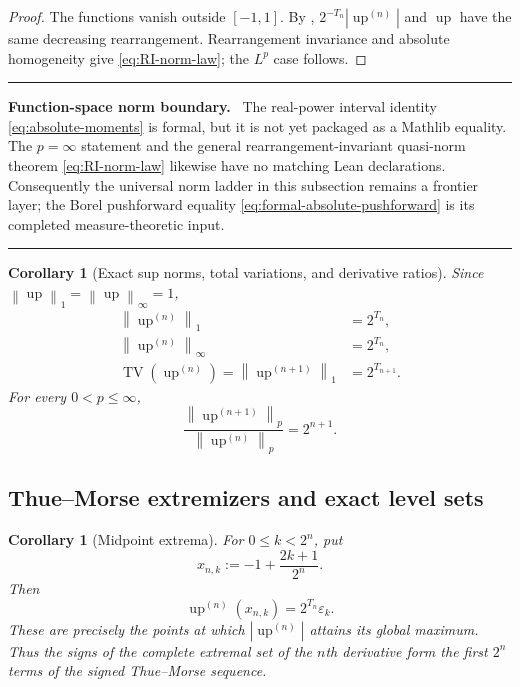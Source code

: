 \documentclass[11pt,oneside]{article}
\numberwithin{equation}{section}
\theoremstyle{plain}
\newtheorem{corollary}[theorem]{Corollary}
\theoremstyle{definition}
\theoremstyle{remark}
\newcommand{\Up}{\operatorname{up}}
\newcommand{\norm}[1]{\left\lVert#1\right\rVert}
\newenvironment{statusbox}[1]{%
  \par\medskip\noindent\begin{minipage}{\textwidth}%
  \color{DeepBlue}\hrule\vspace{5pt}%
  \color{black}\textbf{\color{DeepBlue}#1.}\ }{%
  \par\vspace{5pt}\color{DeepBlue}\hrule
  \end{minipage}\par\medskip}
\begin{document}
\begin{proof}
The functions vanish outside $[-1,1]$.  By ,
$2^{-T_n}|\Up^{(n)}|$ and $\Up$ have the same decreasing rearrangement.  Rearrangement
invariance and absolute homogeneity give \eqref{eq:RI-norm-law}; the $L^p$ case follows.
\end{proof}

\begin{statusbox}{Function-space norm boundary}
The real-power interval identity \eqref{eq:absolute-moments} is formal, but it is not yet
packaged as a Mathlib  equality.  The \(p=\infty\) statement and the general
rearrangement-invariant quasi-norm theorem \eqref{eq:RI-norm-law} likewise have no matching
Lean declarations.  Consequently the universal norm ladder in this subsection remains a
frontier layer; the Borel pushforward equality
\eqref{eq:formal-absolute-pushforward} is its completed measure-theoretic input.
\end{statusbox}

\begin{corollary}[Exact sup norms, total variations, and derivative ratios]
\label{cor:sup-TV}
Since $\norm{\Up}_1=\norm{\Up}_\infty=1$,
\begin{align}
 \norm{\Up^{(n)}}_1&=2^{T_n},\label{eq:L1-exact}\\
 \norm{\Up^{(n)}}_\infty&=2^{T_n},\label{eq:Linf-exact}\\
 \operatorname{TV}(\Up^{(n)})
 =\norm{\Up^{(n+1)}}_1&=2^{T_{n+1}}.
 \label{eq:TV-exact}
\end{align}
For every $0<p\leq\infty$,
\begin{equation}
 \frac{\norm{\Up^{(n+1)}}_p}{\norm{\Up^{(n)}}_p}=2^{n+1}.
 \label{eq:successive-norm-ratio}
\end{equation}
\end{corollary}

\subsection{Thue--Morse extremizers and exact level sets}

\begin{corollary}[Midpoint extrema]
\label{cor:midpoint-extrema}
For $0\leq k<2^n$, put
\begin{equation}
 x_{n,k}:=-1+\frac{2k+1}{2^n}.
 \label{eq:cell-midpoints}
\end{equation}
Then
\begin{equation}
 \boxed{
 \Up^{(n)}(x_{n,k})=2^{T_n}\varepsilon_k.}
 \label{eq:midpoint-values}
\end{equation}
These are precisely the points at which $|\Up^{(n)}|$ attains its global maximum.
Thus the signs of the complete extremal set of the $n$th derivative form the first $2^n$
terms of the signed Thue--Morse sequence.
\end{corollary}
\end{document}
